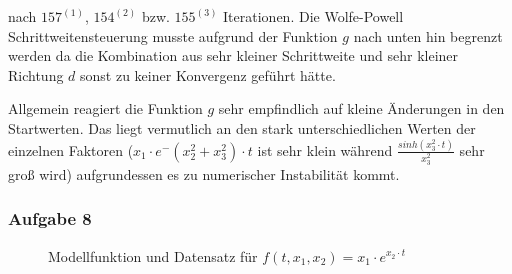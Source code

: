 \documentclass[a4paper, 12pt]{report}
\begin{document}
nach $157^{(1)}$, $154^{(2)}$ bzw. $155^{(3)}$ Iterationen. Die Wolfe-Powell Schrittweitensteuerung musste aufgrund der Funktion $g$ nach unten hin
begrenzt werden da die Kombination aus sehr kleiner Schrittweite und sehr kleiner Richtung $d$ sonst zu keiner Konvergenz geführt
hätte.\par

Allgemein reagiert die Funktion $g$ sehr empfindlich auf kleine Änderungen in den Startwerten. Das liegt vermutlich an den
stark unterschiedlichen Werten der einzelnen Faktoren ($x_1\cdot e^-{ (x_2^2 + x_3^2)\cdot t}$ ist sehr klein während
$\frac{sinh(x_3^2\cdot t)}{x_3^2}$ sehr groß wird) aufgrundessen es zu numerischer Instabilität kommt.


\subsubsection{Aufgabe 8}

\begin{figure}[H]
  \centering
  \caption{Modellfunktion und Datensatz für $f(t, x_1, x_2) = x_1\cdot e^{x_2\cdot t}$}
\end{figure}
\end{document}

